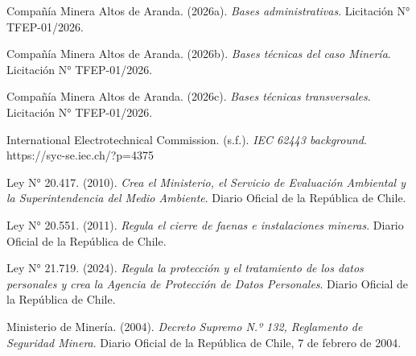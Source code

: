 \documentclass[anexo]{../../comun/overfore}
\begin{document}
\begin{referencias}
\item Compañía Minera Altos de Aranda. (2026a). \emph{Bases administrativas}. Licitación N° TFEP-01/2026.
\item Compañía Minera Altos de Aranda. (2026b). \emph{Bases técnicas del caso Minería}. Licitación N° TFEP-01/2026.
\item Compañía Minera Altos de Aranda. (2026c). \emph{Bases técnicas transversales}. Licitación N° TFEP-01/2026.
\item International Electrotechnical Commission. (s.f.). \emph{IEC 62443 background}. https://syc-se.iec.ch/?p=4375
\item Ley N° 20.417. (2010). \emph{Crea el Ministerio, el Servicio de Evaluación Ambiental y la Superintendencia del Medio Ambiente}. Diario Oficial de la República de Chile.
\item Ley N° 20.551. (2011). \emph{Regula el cierre de faenas e instalaciones mineras}. Diario Oficial de la República de Chile.
\item Ley N° 21.719. (2024). \emph{Regula la protección y el tratamiento de los datos personales y crea la Agencia de Protección de Datos Personales}. Diario Oficial de la República de Chile.
\item Ministerio de Minería. (2004). \emph{Decreto Supremo N.º 132, Reglamento de Seguridad Minera}. Diario Oficial de la República de Chile, 7 de febrero de 2004.
\end{referencias}
\end{document}
